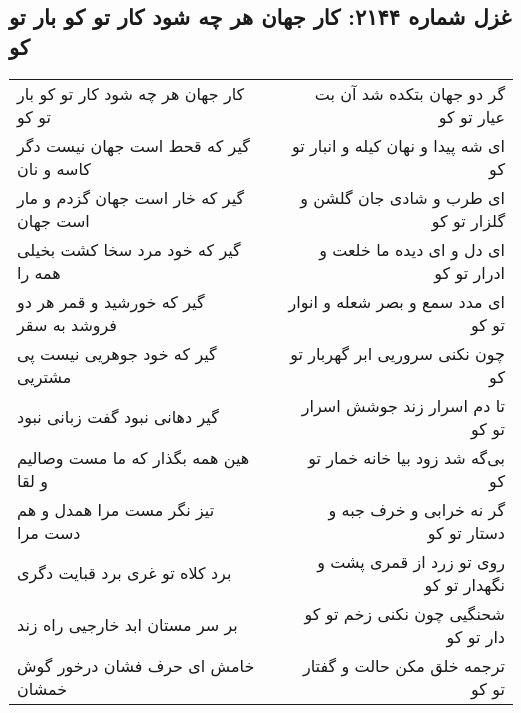 \begin{center}
\section*{غزل شماره ۲۱۴۴: کار جهان هر چه شود کار تو کو بار تو کو}
\label{sec:2144}
\begin{longtable}{l p{0.5cm} r}
کار جهان هر چه شود کار تو کو بار تو کو
&&
گر دو جهان بتکده شد آن بت عیار تو کو
\\
گیر که قحط است جهان نیست دگر کاسه و نان
&&
ای شه پیدا و نهان کیله و انبار تو کو
\\
گیر که خار است جهان گزدم و مار است جهان
&&
ای طرب و شادی جان گلشن و گلزار تو کو
\\
گیر که خود مرد سخا کشت بخیلی همه را
&&
ای دل و ای دیده ما خلعت و ادرار تو کو
\\
گیر که خورشید و قمر هر دو فروشد به سقر
&&
ای مدد سمع و بصر شعله و انوار تو کو
\\
گیر که خود جوهریی نیست پی مشتریی
&&
چون نکنی سروریی ابر گهربار تو کو
\\
گیر دهانی نبود گفت زبانی نبود
&&
تا دم اسرار زند جوشش اسرار تو کو
\\
هین همه بگذار که ما مست وصالیم و لقا
&&
بی‌گه شد زود بیا خانه خمار تو کو
\\
تیز نگر مست مرا همدل و هم دست مرا
&&
گر نه خرابی و خرف جبه و دستار تو کو
\\
برد کلاه تو غری برد قبایت دگری
&&
روی تو زرد از قمری پشت و نگهدار تو کو
\\
بر سر مستان ابد خارجیی راه زند
&&
شحنگیی چون نکنی زخم تو کو دار تو کو
\\
خامش ای حرف فشان درخور گوش خمشان
&&
ترجمه خلق مکن حالت و گفتار تو کو
\\
\end{longtable}
\end{center}
